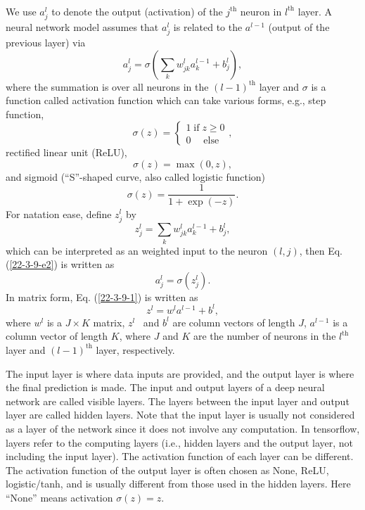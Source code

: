 \documentclass{article}
\newcommand{\tmop}[1]{\ensuremath{\operatorname{#1}}}
\begin{document}
\

We use $a_j^l$ to denote the output (activation) of the $j^{\tmop{th}}$
neuron in $l^{\tmop{th}}$ layer. A neural network model assumes that $a_j^l$
is related to the $a^{l - 1}$ (output of the previous layer) via
\begin{equation}
  \label{22-3-9-e2} a^l_j = \sigma \left( \sum_k w_{j k}^l a^{l - 1}_k + b^l_j
  \right),
\end{equation}
where the summation is over all neurons in the $(l - 1)^{\tmop{th}}$ layer and
$\sigma$ is a function called activation function which can take various
forms, e.g., step function,
\begin{equation}
  \sigma (z) = \left\{ \begin{array}{l}
    1 \tmop{if} z \geqslant 0\\
    0 \quad \tmop{else}
  \end{array} \right.,
\end{equation}
rectified linear unit (ReLU),
\begin{equation}
  \sigma (z) = \max (0, z),
\end{equation}
and sigmoid (``S''-shaped curve, also called logistic function)
\begin{equation}
  \label{23-7-28-p1} \sigma (z) = \frac{1}{1 + \exp (- z)} .
\end{equation}
For natation ease, define $z_j^l$ by
\begin{equation}
  \label{22-3-9-1} z^l_j = \sum_k w_{j k}^l a^{l - 1}_k + b^l_j,
\end{equation}
which can be interpreted as an weighted input to the neuron $(l, j)$, then Eq.
(\ref{22-3-9-e2}) is written as
\begin{equation}
  a_j^l = \sigma (z^l_j) .
\end{equation}
In matrix form, Eq. (\ref{22-3-9-1}) is written as
\begin{equation}
  z^l = w^l a^{l - 1} + b^l,
\end{equation}
where $w^l$ is a $J \times K$ matrix, $z^l$ \ and $b^l$ are column vectors of
length $J$, $a^{l - 1}$ is a column vector of length $K$, where $J$ and $K$
are the number of neurons in the $l^{\tmop{th}}$ layer and $(l -
1)^{\tmop{th}}$ layer, respectively.

The input layer is where data inputs are provided, and the output layer is
where the final prediction is made. The input and output layers of a deep
neural network are called visible layers. The layers between the input layer
and output layer are called hidden layers. Note that the input layer is
usually not considered as a layer of the network since it does not involve any
computation. In tensorflow, layers refer to the computing layers (i.e., hidden
layers and the output layer, not including the input layer). The activation
function of each layer can be different. The activation function of the output
layer is often chosen as None, ReLU, logistic/tanh, and is usually different
from those used in the hidden layers. Here ``None'' means activation $\sigma
(z) = z$.
\end{document}
